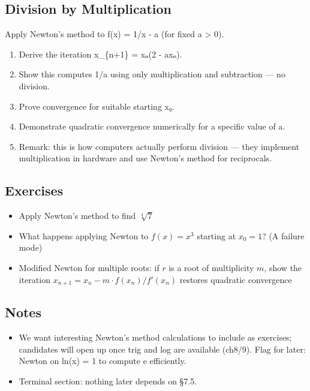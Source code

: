 \documentclass[
  10pt,
  letterpaper,
]{scrbook}
\providecommand{\tightlist}{%
  \setlength{\itemsep}{0pt}\setlength{\parskip}{0pt}}
\begin{document}
\subsection{Division by
Multiplication}\label{division-by-multiplication}

Apply Newton's method to f(x) = 1/x - a (for fixed a \textgreater{} 0).

\begin{enumerate}
\def\labelenumi{(\alph{enumi})}
\item
  Derive the iteration x\_\{n+1\} = xₙ(2 - axₙ).
\item
  Show this computes 1/a using only multiplication and subtraction ---
  no division.
\item
  Prove convergence for suitable starting x₀.
\item
  Demonstrate quadratic convergence numerically for a specific value of
  a.
\item
  Remark: this is how computers actually perform division --- they
  implement multiplication in hardware and use Newton's method for
  reciprocals.
\end{enumerate}

\subsection{Exercises}\label{exercises-33}

\begin{itemize}
\tightlist
\item
  Apply Newton's method to find \(\sqrt[4]{7}\)
\item
  What happens applying Newton to \(f(x) = x^3\) starting at
  \(x_0 = 1\)? (A failure mode)
\item
  Modified Newton for multiple roots: if \(r\) is a root of multiplicity
  \(m\), show the iteration \(x_{n+1} = x_n - m \cdot f(x_n)/f'(x_n)\)
  restores quadratic convergence
\end{itemize}

\subsection{Notes}\label{notes}

\begin{itemize}
\tightlist
\item
  We want interesting Newton's method calculations to include as
  exercises; candidates will open up once trig and log are available
  (ch8/9). Flag for later: Newton on ln(x) = 1 to compute e efficiently.
\item
  Terminal section: nothing later depends on §7.5.
\end{itemize}
\end{document}
